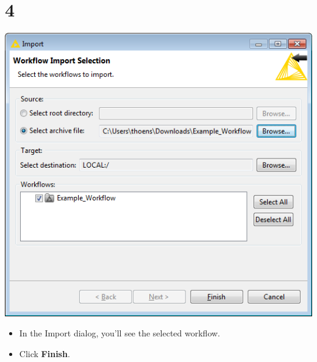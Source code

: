 \documentclass{beamer}
\begin{document}
\section{4}
\begin{frame}
	\begin{center}
  		\includegraphics[height=0.6\textheight]{4.png}
	\end{center}
	\begin{itemize}
		\item In the Import dialog, you'll see the selected workflow.
		\item Click \textbf{Finish}.
	\end{itemize}
\end{frame}
\end{document}
